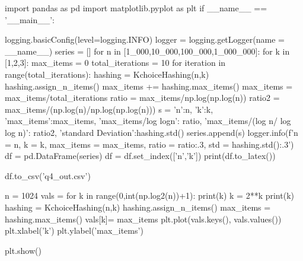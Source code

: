 \documentclass{homeworg}
\begin{document}
\begin{python}
import pandas as pd
import matplotlib.pyplot as plt
if __name__ == '__main__':

    logging.basicConfig(level=logging.INFO)
    logger = logging.getLogger(name = __name__)
    series = []
    for n in [1_000,10_000,100_000,1_000_000]:
        for k in [1,2,3]:
            max_items = 0
            total_iterations = 10
            for iteration in range(total_iterations):
                hashing = KchoiceHashing(n,k)
                hashing.assign_n_items()
                max_items += hashing.max_items()
            max_items = max_items/total_iterations
            ratio = max_items/np.log(np.log(n))
            ratio2 = max_items/(np.log(n)/np.log(np.log(n)))
            s = {
                'n':n,
                'k':k,
                'max_items':max_items,
                'max_items/log logn': ratio,
                'max_items/(log n/ log log n)': ratio2,
                'standard Deviation':hashing.std()
            }
            series.append(s) 
            logger.info(f'n = {n}, k = {k}, max_items = {max_items}, ratio = {ratio:.3}, std = {hashing.std():.3}')
    df = pd.DataFrame(series)
    df = df.set_index(['n','k'])
    print(df.to_latex())

    df.to_csv('q4_out.csv')

    n = 1024
    vals = {}
    for k in range(0,int(np.log2(n))+1):
        print(k)
        k = 2**k
        print(k)
        hashing = KchoiceHashing(n,k)
        hashing.assign_n_items()
        max_items = hashing.max_items()
        vals[k]= max_items
    plt.plot(vals.keys(), vals.values())
    plt.xlabel('k')
    plt.ylabel('max_items')
    
    plt.show()
    




\end{python}
\end{document}
